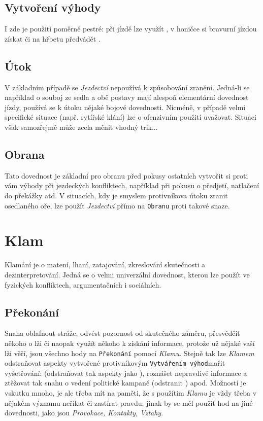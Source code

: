 \documentclass[../main.tex]{subfiles}
\begin{document}
\subsection*{Vytvoření výhody}
\label{subsec:jezdectvi-vytvoreni}
\vytvoreni

I zde je použití poměrně pestré: při jízdě lze využít , v honičce si bravurní jízdou získat  či na hřbetu předvádět . 

\subsection*{Útok}
\label{subsec:jezdectvi-utok}
\utok

V základním případě se \textit{Jezdectví} nepoužívá k způsobování zranění. Jedná-li se například o souboj ze sedla a obě postavy mají alespoň elementární dovednost jízdy, používá se k útoku nějaké bojové dovednosti. Nicméně, v případě velmi specifické situace (např. rytířské klání) lze o ofenzivním použití uvažovat. Situaci však samozřejmě může zcela měnit vhodný trik...

\subsection*{Obrana}
\label{subsec:jezdectvi-obrana}
\obrana

Tato dovednost je základní pro obranu před pokusy ostatních vytvořit si proti vám výhody při jezdeckých konfliktech, například při pokusu o předjetí, natlačení do překážky atd. V situacích, kdy je smyslem protivníkova útoku zranit osedlaného oře, lze použít \textit{Jezdectví} přímo na \texttt{Obranu} proti takové snaze. 

\section{Klam}
\label{sec:klam}


Klamání je o matení, lhaní, zatajování, zkreslování skutečnosti a dezinterpretování. Jedná se o velmi univerzální dovednost, kterou lze použít ve fyzických konfliktech, argumentačních i sociálních.

\subsection*{Překonání}
\label{subsec:klam-prekonani}
\prekonani

Snaha oblafnout stráže, odvést pozornost od skutečného záměru, přesvědčit někoho o lži či naopak využít někoho k získání informace, protože už nějaké vaší lži věří, jsou všechno hody na \texttt{Překonání} pomocí \textit{Klamu}. Stejně tak lze \textit{Klamem} odstraňovat aspekty vytvořené protivníkovým \texttt{Vytvářením výhod}mařit vyšetřování: (odstraňovat tak aspekty jako ), roznášet nepravdivé informace a ztěžovat tak snahu o vedení politické kampaně (odstranit ) apod. Možností je vskutku mnoho, je ale třeba mít na paměti, že s použítim \textit{Klamu} je vždy třeba v nějakém významu neříkat či zastírat pravdu; jinak by se měl použít hod na jiné dovednosti, jako jsou \textit{Provokace, Kontakty, Vztahy}.
\end{document}
